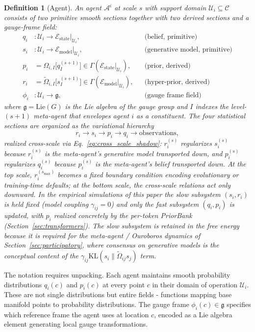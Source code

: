 \documentclass[11pt]{article}
\newtheorem{definition}{Definition}
\begin{document}
\begin{definition}[Agent]
An agent $\mathcal{A}^i$ at scale $s$ with support domain $\mathcal{U}_i \subseteq \mathcal{C}$ consists of two primitive smooth sections together with two derived sections and a gauge-frame field:
\begin{align}
q_i &: \mathcal{U}_i \to \mathcal{E}_{\mathrm{state}}|_{\mathcal{U}_i}, &&\text{(belief, primitive)} \\
s_i &: \mathcal{U}_i \to \mathcal{E}_{\mathrm{model}}|_{\mathcal{U}_i}, &&\text{(generative model, primitive)} \\
p_i &= \Omega_{i,I}\big[q_I^{(s+1)}\big] \in \Gamma\left(\mathcal{E}_{\mathrm{state}}|_{\mathcal{U}_i}\right), &&\text{(prior, derived)} \\
r_i &= \tilde\Omega_{i,I}\big[s_I^{(s+1)}\big] \in \Gamma\left(\mathcal{E}_{\mathrm{model}}|_{\mathcal{U}_i}\right), &&\text{(hyper-prior, derived)} \\
\phi_i &: \mathcal{U}_i \to \mathfrak{g}, &&\text{(gauge frame field)}
\end{align}
where $\mathfrak{g} = \mathrm{Lie}(G)$ is the Lie algebra of the gauge group and $I$ indexes the level-$(s{+}1)$ meta-agent that envelopes agent $i$ as a constituent. The four statistical sections are organized as the variational hierarchy
\[
r_i \to s_i \to p_i \to q_i \to \text{observations},
\]
realized cross-scale via Eq.~\eqref{eq:cross_scale_shadow}: $r_i^{(s)}$ regularizes $s_i^{(s)}$ because $r_i^{(s)}$ is the meta-agent's generative model transported down, and $p_i^{(s)}$ regularizes $q_i^{(s)}$ because $p_i^{(s)}$ is the meta-agent's belief transported down. At the top scale, $r_i^{(s_{\max})}$ becomes a fixed boundary condition encoding evolutionary or training-time defaults; at the bottom scale, the cross-scale relations act only downward. In the empirical simulations of this paper the slow subsystem $(s_i, r_i)$ is held fixed (model coupling $\gamma_{ij} = 0$) and only the fast subsystem $(q_i, p_i)$ is updated, with $p_i$ realized concretely by the per-token PriorBank (Section~\ref{sec:transformers}). The slow subsystem is retained in the free energy because it is required for the meta-agent / Ouroboros dynamics of Section~\ref{sec:participatory}, where consensus on generative models is the conceptual content of the $\gamma_{ij}\mathrm{KL}(s_i\|\tilde{\Omega}_{ij}s_j)$ term.
\end{definition}

The notation requires unpacking. Each agent maintains smooth probability distributions $q_i(c)$ and $p_i(c)$ at every point $c$ in their domain of operation $\mathcal{U}_i$. These are not single distributions but entire fields - functions mapping base manifold points to probability distributions. The gauge frame $\phi_i(c) \in \mathfrak{g}$ specifies which reference frame the agent uses at location $c$, encoded as a Lie algebra element generating local gauge transformations.
\end{document}
